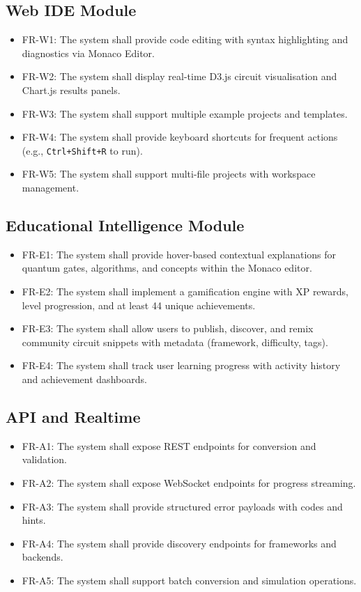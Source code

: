 \subsection{Web IDE Module}
\begin{itemize}
    \item FR-W1: The system shall provide code editing with syntax highlighting and diagnostics via Monaco Editor.
    \item FR-W2: The system shall display real-time D3.js circuit visualisation and Chart.js results panels.
    \item FR-W3: The system shall support multiple example projects and templates.
    \item FR-W4: The system shall provide keyboard shortcuts for frequent actions (e.g., \texttt{Ctrl+Shift+R} to run).
    \item FR-W5: The system shall support multi-file projects with workspace management.
\end{itemize}

\subsection{Educational Intelligence Module}
\begin{itemize}
    \item FR-E1: The system shall provide hover-based contextual explanations for quantum gates, algorithms, and concepts within the Monaco editor.
    \item FR-E2: The system shall implement a gamification engine with XP rewards, level progression, and at least 44 unique achievements.
    \item FR-E3: The system shall allow users to publish, discover, and remix community circuit snippets with metadata (framework, difficulty, tags).
    \item FR-E4: The system shall track user learning progress with activity history and achievement dashboards.
\end{itemize}

\subsection{API and Realtime}
\begin{itemize}
    \item FR-A1: The system shall expose REST endpoints for conversion and validation.
    \item FR-A2: The system shall expose WebSocket endpoints for progress streaming.
    \item FR-A3: The system shall provide structured error payloads with codes and hints.
    \item FR-A4: The system shall provide discovery endpoints for frameworks and backends.
    \item FR-A5: The system shall support batch conversion and simulation operations.
\end{itemize}

